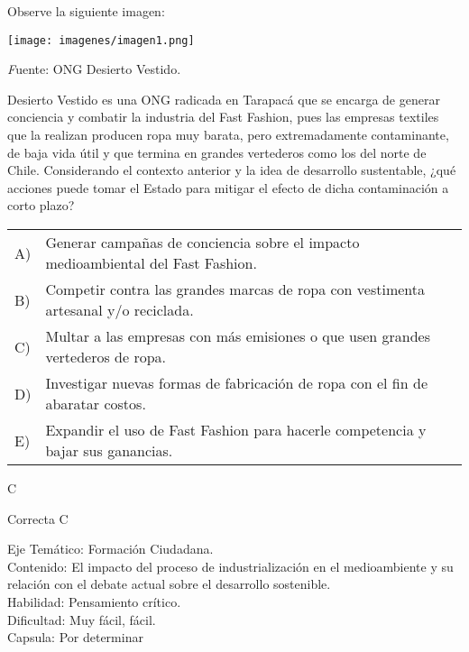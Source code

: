 \documentclass[letterpaper,11pt]{article}
\newcommand{\anchopregunta}{0.9\textwidth}
\begin{document}
\begin{enumerate}
\begin{minipage}{\anchopregunta}
\item Observe la siguiente imagen:
\begin{center}
\texttt{[image: imagenes/imagen1.png]}
\end{center}
\begin{flushright}
\textit Fuente: ONG Desierto Vestido.
\end{flushright}
Desierto Vestido es una ONG radicada en Tarapacá que se encarga de generar conciencia y combatir la industria del Fast Fashion, pues las empresas textiles que la realizan producen ropa muy barata, pero extremadamente contaminante, de baja vida útil y que termina en grandes vertederos como los del norte de Chile. Considerando el contexto anterior y la idea de desarrollo sustentable, ¿qué acciones puede tomar el Estado para mitigar el efecto de dicha contaminación a corto plazo?
\begin{flushleft}\begin{tabular}{@{\hspace{-.001\textwidth}}l@{\hspace{2pt}}p{}}
A)& Generar campañas de conciencia sobre el impacto medioambiental del Fast Fashion.\\
B)& Competir contra las grandes marcas de ropa con vestimenta artesanal y/o reciclada.\\
C)& Multar a las empresas con más emisiones o que usen grandes vertederos de ropa.\\
D)& Investigar nuevas formas de fabricación de ropa con el fin de abaratar costos.\\
E)& Expandir el uso de Fast Fashion para hacerle competencia y bajar sus ganancias.\\ 
\end{tabular}\end{flushleft}%
\begin{key} C
\end{key} 
\begin{hint}
\end{hint}
\begin{answer} Correcta C \\
\end{answer}
\begin{info} %
\begin{flushleft}
Eje Temático: Formación Ciudadana.\\
Contenido: El impacto del proceso de industrialización en el medioambiente y su relación con el debate actual sobre el desarrollo sostenible.\\
Habilidad: Pensamiento crítico.\\
Dificultad: Muy fácil, fácil. \\
Capsula: Por determinar \\
\end{flushleft} 
\end{info}
\end{minipage}\vfill$\;$ %


\end{enumerate}
\end{document}
